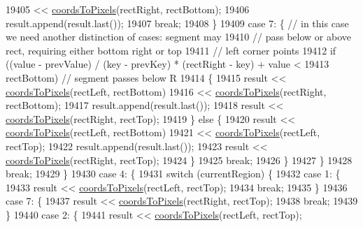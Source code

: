 \begin{DoxyCode}
19405              << \hyperlink{class_q_c_p_abstract_plottable_ade710a776104b14c1c835168ce1bfc5c}{coordsToPixels}(rectRight, rectBottom);
19406       result.append(result.last());
19407       \textcolor{keywordflow}{break};
19408     \}
19409     \textcolor{keywordflow}{case} 7: \{ \textcolor{comment}{// in this case we need another distinction of cases: segment may}
19410               \textcolor{comment}{// pass below or above rect, requiring either bottom right or top}
19411               \textcolor{comment}{// left corner points}
19412       \textcolor{keywordflow}{if} ((value - prevValue) / (key - prevKey) * (rectRight - key) + value <
19413           rectBottom) \textcolor{comment}{// segment passes below R}
19414       \{
19415         result << \hyperlink{class_q_c_p_abstract_plottable_ade710a776104b14c1c835168ce1bfc5c}{coordsToPixels}(rectLeft, rectBottom)
19416                << \hyperlink{class_q_c_p_abstract_plottable_ade710a776104b14c1c835168ce1bfc5c}{coordsToPixels}(rectRight, rectBottom);
19417         result.append(result.last());
19418         result << \hyperlink{class_q_c_p_abstract_plottable_ade710a776104b14c1c835168ce1bfc5c}{coordsToPixels}(rectRight, rectTop);
19419       \} \textcolor{keywordflow}{else} \{
19420         result << \hyperlink{class_q_c_p_abstract_plottable_ade710a776104b14c1c835168ce1bfc5c}{coordsToPixels}(rectLeft, rectBottom)
19421                << \hyperlink{class_q_c_p_abstract_plottable_ade710a776104b14c1c835168ce1bfc5c}{coordsToPixels}(rectLeft, rectTop);
19422         result.append(result.last());
19423         result << \hyperlink{class_q_c_p_abstract_plottable_ade710a776104b14c1c835168ce1bfc5c}{coordsToPixels}(rectRight, rectTop);
19424       \}
19425       \textcolor{keywordflow}{break};
19426     \}
19427     \}
19428     \textcolor{keywordflow}{break};
19429   \}
19430   \textcolor{keywordflow}{case} 4: \{
19431     \textcolor{keywordflow}{switch} (currentRegion) \{
19432     \textcolor{keywordflow}{case} 1: \{
19433       result << \hyperlink{class_q_c_p_abstract_plottable_ade710a776104b14c1c835168ce1bfc5c}{coordsToPixels}(rectLeft, rectTop);
19434       \textcolor{keywordflow}{break};
19435     \}
19436     \textcolor{keywordflow}{case} 7: \{
19437       result << \hyperlink{class_q_c_p_abstract_plottable_ade710a776104b14c1c835168ce1bfc5c}{coordsToPixels}(rectRight, rectTop);
19438       \textcolor{keywordflow}{break};
19439     \}
19440     \textcolor{keywordflow}{case} 2: \{
19441       result << \hyperlink{class_q_c_p_abstract_plottable_ade710a776104b14c1c835168ce1bfc5c}{coordsToPixels}(rectLeft, rectTop);

\end{DoxyCode}
